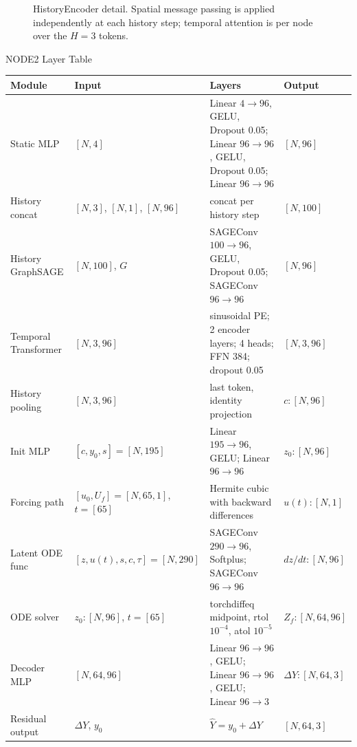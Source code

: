 \documentclass[10pt]{article}
\begin{document}
\begin{figure}[h!]
{%
}
\caption*{HistoryEncoder detail. Spatial message passing is applied independently at each history step; temporal attention is per node over the $H=3$ tokens.}
\end{figure}

\newpage
\begin{center}
{\Large NODE2 Layer Table}
\end{center}

\renewcommand{\arraystretch}{1.2}
\begin{tabular}{p{} p{} p{} p{}}
\toprule
Module & Input & Layers & Output \\
\midrule
Static MLP & $[N,4]$ & Linear $4\to96$, GELU, Dropout 0.05; Linear $96\to96$, GELU, Dropout 0.05; Linear $96\to96$ & $[N,96]$ \\
History concat & $[N,3]$, $[N,1]$, $[N,96]$ & concat per history step & $[N,100]$ \\
History GraphSAGE & $[N,100]$, $G$ & SAGEConv $100\to96$, GELU, Dropout 0.05; SAGEConv $96\to96$ & $[N,96]$ \\
Temporal Transformer & $[N,3,96]$ & sinusoidal PE; 2 encoder layers; 4 heads; FFN 384; dropout 0.05 & $[N,3,96]$ \\
History pooling & $[N,3,96]$ & last token, identity projection & $c:[N,96]$ \\
Init MLP & $[c,y_0,s]=[N,195]$ & Linear $195\to96$, GELU; Linear $96\to96$ & $z_0:[N,96]$ \\
Forcing path & $[u_0,U_f]=[N,65,1]$, $t=[65]$ & Hermite cubic with backward differences & $u(t):[N,1]$ \\
Latent ODE func & $[z,u(t),s,c,\tau]=[N,290]$ & SAGEConv $290\to96$, Softplus; SAGEConv $96\to96$ & $dz/dt:[N,96]$ \\
ODE solver & $z_0:[N,96]$, $t=[65]$ & torchdiffeq midpoint, rtol $10^{-4}$, atol $10^{-5}$ & $Z_f:[N,64,96]$ \\
Decoder MLP & $[N,64,96]$ & Linear $96\to96$, GELU; Linear $96\to96$, GELU; Linear $96\to3$ & $\Delta Y:[N,64,3]$ \\
Residual output & $\Delta Y$, $y_0$ & $\widehat{Y}=y_0+\Delta Y$ & $[N,64,3]$ \\
\bottomrule
\end{tabular}
\end{document}
